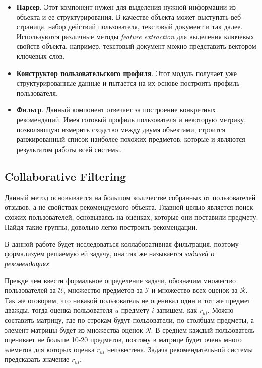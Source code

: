 \begin{itemize}
\item \textbf{Парсер}. Этот компонент нужен для выделения нужной информации из объекта и ее структурирования. В качестве объекта может выступать веб-страница, набор действий пользователя, текстовый документ и так далее. Используются различные методы \textit{feature extraction} для выделения ключевых свойств объекта, например, текстовый документ можно представить вектором ключевых слов.

\item \textbf{Конструктор пользовательского профиля}. Этот модуль получает уже структурированные данные и пытается на их основе построить профиль пользователя. 

\item \textbf{Фильтр}. Данный компонент отвечает за построение конкретных рекомендаций. Имея готовый профиль пользователя и некоторую метрику, позволяющую измерить сходство между двумя объектами, строится ранжированный список наиболее похожих предметов, которые и являются результатом работы всей системы.

\end{itemize}

\subsection{Collaborative Filtering}

Данный метод основывается на большом количестве собранных от пользователей отзывов, а не свойствах рекомендуемого объекта. Главной целью является поиск схожих пользователей, основываясь на оценках, которые они поставили предмету. Найдя такие группы, довольно легко построить рекомендации.

В данной работе будет исследоваться коллаборативная фильтрация, поэтому формализуем решаемую ей задачу, она так же называется \textit{задачей о рекомендациях}.

Прежде чем ввести формальное определение задачи, обозначим множество пользователей за $\mathcal{U}$, множество предметов за $\mathcal{I}$ и множество всех оценок за $\mathcal{R}$. Так же оговорим, что никакой пользователь не оценивал один и тот же предмет дважды, тогда оценка пользователя $u$ предмету $i$ запишем, как $r_{ui}$. Можно составить матрицу, где по строкам будут пользователи, по столбцам предметы, а элемент матрицы будет из множества оценок $\mathcal{R}$. В среднем каждый пользователь оценивает не больше 10-20 предметов, поэтому в матрице будет очень много элеметов для которых оценка $r_{ui}$ неизвестена. Задача рекомендательной системы предсказать значение $r_{ui}$. 

